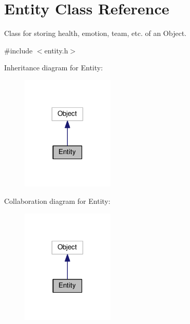 \hypertarget{classEntity}{}\section{Entity Class Reference}
\label{classEntity}


Class for storing health, emotion, team, etc. of an Object.  




{\ttfamily \#include $<$entity.\+h$>$}



Inheritance diagram for Entity\+:
\nopagebreak
\begin{figure}[H]
\begin{center}
\leavevmode
\includegraphics[width=125pt]{classEntity__inherit__graph}
\end{center}
\end{figure}


Collaboration diagram for Entity\+:
\nopagebreak
\begin{figure}[H]
\begin{center}
\leavevmode
\includegraphics[width=125pt]{classEntity__coll__graph}
\end{center}
\end{figure}
